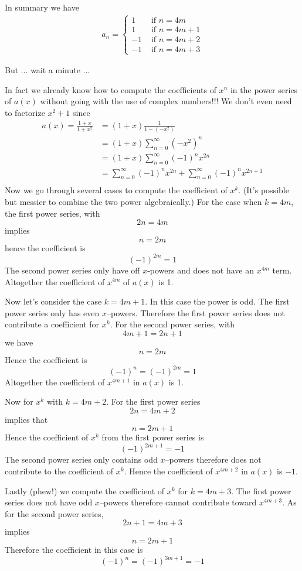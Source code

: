 In summary we have
\begin{align*}
a_n =
\begin{cases}
1 & \text{ if } n = 4m \\
1 & \text{ if } n = 4m + 1 \\
-1 & \text{ if } n = 4m + 2 \\
-1 & \text{ if } n = 4m + 3
\end{cases}
\end{align*}

But ... wait a minute ...

In fact we already know how to compute the coefficients
of $x^n$ in the power series of $a(x)$ without going with the use of 
complex numbers!!! We don't even need to factorize $x^2 + 1$ since
\begin{align*}
a(x) = \frac{1+x}{1+x^2}
&= (1+x) \frac{1}{1 - (-x^2)} \\
&= (1+x) \sum_{n=0}^\infty (-x^2)^n \\
&= (1+x) \sum_{n=0}^\infty (-1)^n x^{2n} \\
&= \sum_{n=0}^\infty (-1)^n x^{2n} + \sum_{n=0}^\infty (-1)^n x^{2n+1} \\
\end{align*}
Now we go through several cases to compute the coefficient of $x^k$.
(It's possible but messier to combine the two power algebraically.)
For the case when $k = 4m$, the first power series, with 
\[
2n = 4m
\] 
implies
\[
n = 2m
\] 
hence the coefficient is 
\[
(-1)^{2m} = 1
\]
The second power series only have off $x$-powers and does not have
an $x^{4m}$ term. Altogether the coefficient of $x^{4m}$ of $a(x)$ is 1.

Now let's consider the case $k = 4m + 1$. In this case the power is odd.
The first power series only has even $x$--powers. 
Therefore the first power series does not contribute a coefficient for 
$x^k$.
For the second power series, with 
\[
4m + 1 = 2n + 1
\]
we have
\[
n = 2m
\]
Hence the coefficient is 
\[
(-1)^n = (-1)^{2m} = 1
\]
Altogether the coefficient of $x^{4m+1}$ in $a(x)$ is 1.

Now for $x^k$ with $k = 4m + 2$.
For the first power series
\[
2n = 4m + 2
\]
implies that 
\[
n = 2m + 1
\]
Hence the coefficient of $x^k$ from the first power series is 
\[
(-1)^{2m+1} = -1
\] 
The second power series only contains odd $x$--powers therefore
does not contribute to the coefficient of $x^k$.
Hence the coefficient of $x^{4m+2}$ in $a(x)$ is $-1$.

Lastly (phew!) we compute the coefficient of $x^k$ for $k=4m+3$.
The first power series does not have odd $x$--powers therefore cannot
contribute toward $x^{4m+3}$.
As for the second power series, 
\[
2n + 1 = 4m + 3
\] 
implies
\[
n = 2m + 1
\] 
Therefore the coefficient in this case is 
\[
(-1)^n = (-1)^{3m+1} = -1
\]

